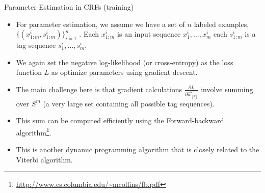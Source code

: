 \documentclass[handout]{beamer}
\begin{document}
\begin{frame}{Parameter Estimation in CRFs (training)}
\begin{scriptsize}

\begin{itemize}
\item For parameter estimation, we assume we have a set of $n$ labeled examples, $\{(x_{1:m}^i, s_{1:m}^i )\}_{i=1}^n$ . Each $x_{1:m}^i$ is an input sequence $x_1^i, \dots , x_m^i$ each $s_{1:m}^i$ is a tag sequence $s_1^i, \dots , s_m^i$.

\item We again set the negative log-likelihood (or cross-entropy) as the loss function $L$ as optimize parameters using gradient descent.

\item The main challenge here is that gradient calculations $\frac{\partial L}{\partial \vec{w}_{[k]}}$ involve summing over $S^m$ (a very large set containing all possible tag sequences).

\item This sum can be computed efficiently using the Forward-backward algorithm\footnote{\url{http://www.cs.columbia.edu/~mcollins/fb.pdf}}. 

\item This is another dynamic programming algorithm that is closely related
to the Viterbi algorithm.

\end{itemize}


\end{scriptsize}
\end{frame}
\end{document}
